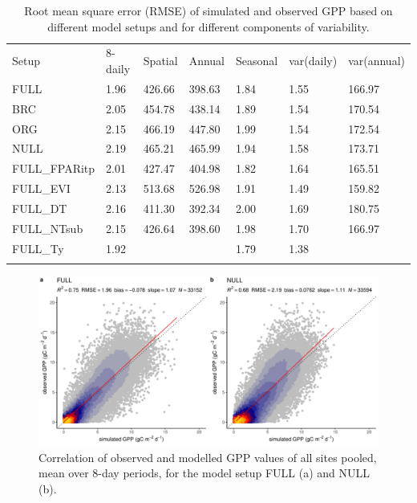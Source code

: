 \documentclass[gmd, manuscript]{copernicus}
\begin{document}
\begin{table}[t]
\caption{Root mean square error (RMSE) of simulated and observed GPP based on different model setups and for different components of variability.} 
\begin{tabular}{lllllll}
  \tophline
  Setup & 8-daily & Spatial & Annual & Seasonal & var(daily) & var(annual) \\ 
  \middlehline
  FULL & 1.96 & 426.66 & 398.63 & 1.84 & 1.55 & 166.97 \\ 
  BRC & 2.05 & 454.78 & 438.14 & 1.89 & 1.54 & 170.54 \\ 
  ORG & 2.15 & 466.19 & 447.80 & 1.99 & 1.54 & 172.54 \\ 
  NULL & 2.19 & 465.21 & 465.99 & 1.94 & 1.58 & 173.71 \\ 
  \middlehline
  FULL\_FPARitp & 2.01 & 427.47 & 404.98 & 1.82 & 1.64 & 165.51 \\ 
  FULL\_EVI & 2.13 & 513.68 & 526.98 & 1.91 & 1.49 & 159.82 \\ 
  \middlehline
  FULL\_DT & 2.16 & 411.30 & 392.34 & 2.00 & 1.69 & 180.75 \\ 
  FULL\_NTsub & 2.15 & 426.64 & 398.60 & 1.98 & 1.70 & 166.97 \\ 
  FULL\_Ty & 1.92 &  &  & 1.79 & 1.38 &  \\ 
  \bottomhline
  \end{tabular}
\label{tab:rmse}
\end{table}

\begin{figure}[t]
    \includegraphics[width=12cm]{fig/modobs_xdaily.pdf}
    \caption{Correlation of observed and modelled GPP values of all sites pooled, mean over 8-day periods, for the model setup FULL (a) and NULL (b).}
    \label{fig:modobs_xdaily}
\end{figure}
\end{document}

